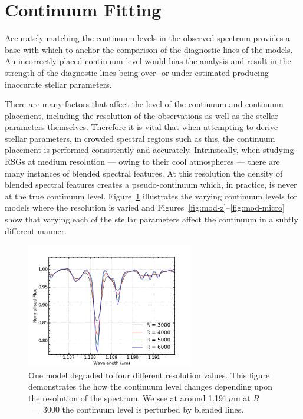 \section{Continuum Fitting} %
\label{sec:continuum_fitting}

Accurately matching the continuum levels in the observed
spectrum provides a base with which to anchor the comparison of the diagnostic lines of the models.
An incorrectly placed continuum level would bias the analysis and result in the
strength of the diagnostic lines being over- or under-estimated producing inaccurate stellar parameters.

There are many factors that affect the level of the continuum and continuum placement,
including the resolution of the observations as well as the stellar parameters themselves.
Therefore it is vital that when attempting to derive stellar parameters,
in crowded spectral regions such as this, the continuum placement is performed
consistently and accurately.
Intrinsically, when studying RSGs at medium resolution --- owing  to their cool atmospheres ---
there are many instances of blended spectral features.
At this resolution the density of blended spectral features creates a pseudo-continuum which, in practice,
is never at the true continuum level.
Figure~\ref{fig:mod-res} illustrates the varying continuum levels for models where the resolution is varied and
Figures~\ref{fig:mod-z}--\ref{fig:mod-micro} show that varying each of the stellar parameters affect the continuum in a subtly different manner.

\begin{figure}
 \centering
\includegraphics[width=0.65\textwidth]{JAnal/Resolution}
\caption[An example of the effect of the spectral resoltuion on the appearance of the model gird spectra]{
One model degraded to four different resolution values.
This figure demonstrates the how the continuum level changes depending upon
the resolution of the spectrum.
We see at around 1.191\,$\mu$m at $R$~=~3000 the continuum level is perturbed by blended lines.\label{fig:mod-res}
         }
\end{figure}

